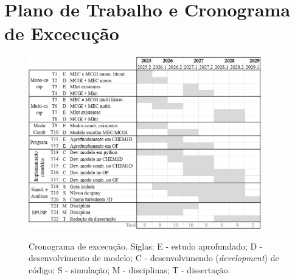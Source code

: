 \section{Plano de Trabalho e Cronograma de Excecução}


\begin{figure}[ht]
    \centering
    \caption{Cronograma de excecução. Siglas: E - estudo aprofundado; D - desenvolvimento de modelo; C - desenvolvimendo (\emph{development}) de código; S - simulação; M - disciplinas; T - dissertação.}
    \includegraphics[width=0.9\textwidth]{30_images/cronograma-3.png}
    \label{fig:cronograma}
\end{figure}



